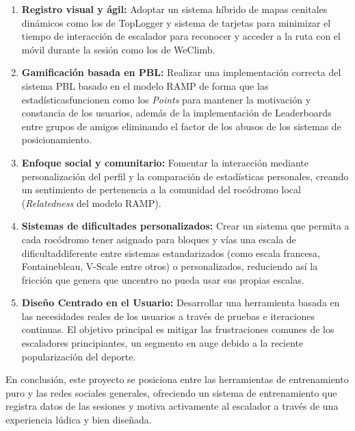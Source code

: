 \begin{enumerate}
\item \textbf{Registro visual y ágil:} Adoptar un sistema híbrido de mapas cenitales dinámicos como los de TopLogger y sistema de tarjetas para minimizar el tiempo de interacción de escalador para reconocer y acceder a la ruta con el móvil durante la sesión como los de WeClimb.

\item \textbf{Gamificación basada en PBL:} Realizar una implementación correcta del sistema PBL basado en el modelo RAMP de forma que las estadísticasfuncionen como los \textit{Points} para mantener la motivación y constancia de los usuarios, además de la implementación de Leaderboards entre grupos de amigos eliminando el factor de los abusos de los sistemas de posicionamiento.

\item \textbf{Enfoque social y comunitario:} Fomentar la interacción mediante personalización del perfil y la comparación de estadísticas personales, creando un sentimiento de pertenencia a la comunidad del rocódromo local (\textit{Relatedness} del modelo RAMP).

\item \textbf{Sistemas de dificultades personalizados:} Crear un sistema que permita a cada rocódromo tener asignado para bloques y vías una escala de dificultaddiferente entre sistemas estandarizados (como escala francesa, Fontainebleau, V-Scale entre otros) o personalizados, reduciendo así la fricción que genera que uncentro no pueda usar sus propias escalas.

\item \textbf{Diseño Centrado en el Usuario:} Desarrollar una herramienta basada en las necesidades reales de los usuarios a través de pruebas e iteraciones continuas. El objetivo principal es mitigar las frustraciones comunes de los escaladores principiantes, un segmento en auge debido a la reciente popularización del deporte.
\end{enumerate}

En conclusión, este proyecto se posiciona entre las herramientas de entrenamiento puro y las redes sociales generales, ofreciendo un sistema de entrenamiento que registra datos de las sesiones y motiva activamente al escalador a través de una experiencia lúdica y bien diseñada.